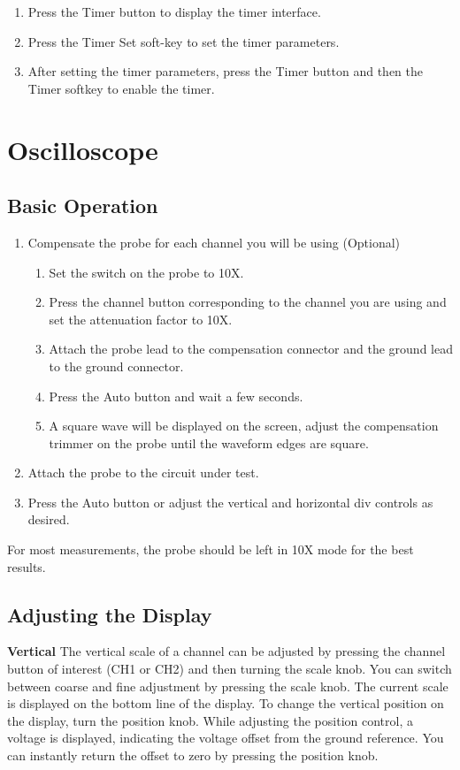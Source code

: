 \begin{enumerate}
\item Press the Timer button to display the timer interface.
\item Press the Timer Set soft-key to set the timer parameters.
\item After setting the timer parameters, press the Timer button and then the Timer softkey to enable the timer.
\end{enumerate}

\section{Oscilloscope}
\subsection{Basic Operation}
\begin{enumerate}
\item Compensate the probe for each channel you will be using (Optional)
\begin{enumerate}
\item Set the switch on the probe to 10X.
\item Press the channel button corresponding to the channel you are using and set the attenuation factor to 10X.
\item Attach the probe lead to the compensation connector and the ground lead to the ground connector.
\item Press the Auto button and wait a few seconds.
\item A square wave will be displayed on the screen, adjust the compensation trimmer on the probe until the waveform edges are square.
\end{enumerate}
\item Attach the probe to the circuit under test.
\item Press the Auto button or adjust the vertical and horizontal div controls as desired.
\end{enumerate}
For most measurements, the probe should be left in 10X mode for the best results.

\subsection{Adjusting the Display}

\textbf{Vertical}
The vertical scale of a channel can be adjusted by pressing the channel button of interest (CH1 or CH2) and then turning the scale knob. You can switch between coarse and fine adjustment by pressing the scale knob. The current scale is displayed on the bottom line of the display. To change the vertical position on the display, turn the position knob. While adjusting the position control, a voltage is displayed, indicating the voltage offset from the ground reference. You can instantly return the offset to zero by pressing the position knob.

